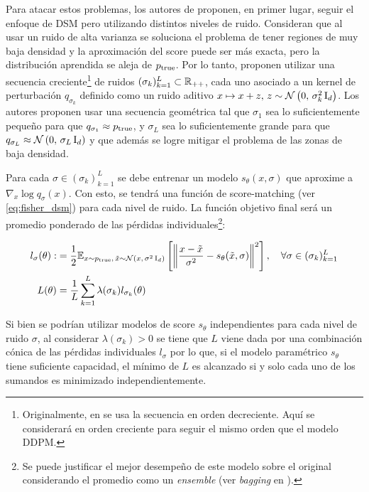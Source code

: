 Para atacar estos problemas, los autores de \cite{song2020generative} proponen, en primer lugar, seguir el enfoque de DSM pero utilizando distintos niveles de ruido. Consideran que al usar un ruido de alta varianza se soluciona el problema de tener regiones de muy baja densidad y la aproximación del score puede ser más exacta, pero la distribución aprendida se aleja de $p_{\operatorname{true}}$. Por lo tanto, proponen utilizar una secuencia creciente\footnote{Originalmente, en \cite{song2020generative} se usa la secuencia en orden decreciente. Aquí se considerará en orden creciente para seguir el mismo orden que el modelo DDPM.} de ruidos $(\sigma_k)_{k=1}^L\subset\mathbb{R}_{++}$, cada uno asociado a un kernel de perturbación $q_{\sigma_k}$ definido como un ruido aditivo $x\mapsto x+z,\,z\sim\mathcal{N}\left(0,\,\sigma_k^2 \operatorname{I}_{d}\right)$. Los autores proponen usar una secuencia geométrica tal que $\sigma_1$ sea lo suficientemente pequeño para que $q_{\sigma_1}\approx p_{\operatorname{true}}$, y $\sigma_L$ sea lo suficientemente grande para que $q_{\sigma_L}\approx\mathcal{N}\left(0,\,\sigma_L\operatorname{I}_{d}\right)$ y que además se logre mitigar el problema de las zonas de baja densidad.

Para cada $\sigma\in(\sigma_k)_{k=1}^L$ se debe entrenar un modelo $s_\theta(x,\sigma)$ que aproxime a $\nabla_x \log q_\sigma(x)$. Con esto, se tendrá una función de score-matching (ver \eqref{eq:fisher_dsm}) para cada nivel de ruido. La función objetivo final será un promedio ponderado de las pérdidas individuales\footnote{Se puede justificar el mejor desempeño de este modelo sobre el original considerando el promedio como un \textit{ensemble} (ver \textit{bagging} en \cite{bishop2006pattern}).}:

\begin{align}
    \label{eq:dsm_loss}
    l_\sigma(\theta) : & = \frac{1}{2}\mathbb{E}_{x\sim p_{\operatorname{true}},\,\tilde{x}\sim \mathcal{N}\left(x,\,\sigma^2 \operatorname{I}_{d}\right)}\left[\left\lVert \frac{x-\tilde{x}}{\sigma^2} - s_\theta(\tilde{x}, \sigma) \right\rVert^2\right],\quad \forall\sigma\in (\sigma_k)_{k=1}^L \\
    L(\theta)          & = \frac{1}{L} \sum_{k=1}^L \lambda(\sigma_k) l_{\sigma_k}(\theta)
\end{align}

Si bien se podrían utilizar modelos de score $s_\theta$ independientes para cada nivel de ruido $\sigma$, al considerar $\lambda(\sigma_k)>0$ se tiene que $L$ viene dada por una combinación cónica de las pérdidas individuales $l_\sigma$ por lo que, si el modelo paramétrico $s_\theta$ tiene suficiente capacidad, el mínimo de $L$ es alcanzado si y solo cada uno de los sumandos es minimizado independientemente.

